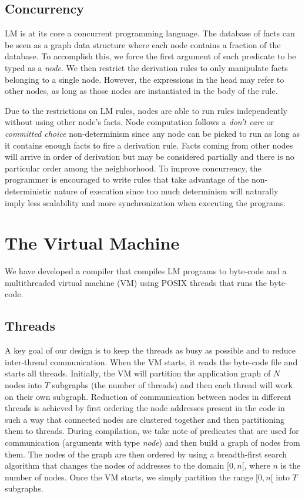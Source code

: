 \documentclass{sigplanconf}
\begin{document}
\subsection{Concurrency}

LM is at its core a concurrent programming language. The database of
facts can be seen as a graph data structure where each node contains a
fraction of the database.  To accomplish this, we force the first
argument of each predicate to be typed as a \emph{node}. We then
restrict the derivation rules to only manipulate facts belonging to a
single node.  However, the expressions in the head may refer to other
nodes, as long as those nodes are instantiated in the body of the
rule.

Due to the restrictions on LM rules, nodes are able to run rules
independently without using other node's facts. Node computation
follows a \emph{don't care} or \emph{committed choice} non-determinism
since any node can be picked to run as long as it contains enough
facts to fire a derivation rule.  Facts coming from other nodes will
arrive in order of derivation but may be considered partially and
there is no particular order among the neighborhood. To improve
concurrency, the programmer is encouraged to write rules that take
advantage of the non-deterministic nature of execution since too much
determinism will naturally imply less scalability and more synchronization
when executing the programs.
 
\makeatletter{}\section{The Virtual Machine}
\label{virtual_machine}

We have developed a compiler that compiles LM programs to byte-code
and a multithreaded virtual machine (VM) using POSIX threads
that runs the byte-code.


\subsection{Threads}

A key goal of our design is to keep the threads as busy as possible
and to reduce inter-thread communication. When the VM starts, it reads
the byte-code file and starts all threads. Initially, the VM will
partition the application graph of $N$ nodes into $T$ subgraphs (the
number of threads) and then each thread will work on their own
subgraph. Reduction of communication between nodes in different threads
is achieved by first ordering the node addresses present in the code in such a way that
connected nodes are clustered together and then partitioning them to
threads. During compilation, we take note of predicates that are used
for communication (arguments with type \emph{node}) and
then build a graph of nodes from them. The nodes of
the graph are then ordered by using a breadth-first search algorithm
that changes the nodes of addresses to the domain $[0, n[$, where $n$
is the number of nodes. Once the VM starts, we simply partition the
range $[0, n[$ into $T$ subgraphs.
\end{document}
